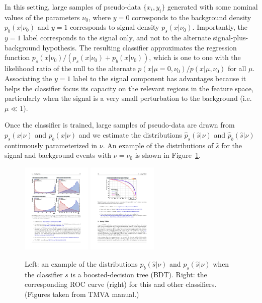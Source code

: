 \documentclass[12pt]{article}
\numberwithin{equation}{section}
\theoremstyle{plain}
\begin{document}
In this setting, large samples of pseudo-data $\{x_i, y_i\}$ generated with some
nominal values of the parameters $\nu_0$, where $y=0$ corresponds to the
background density $p_b(x|\nu_0)$  and $y=1$ corresponds to signal density
$p_s(x|\nu_0)$. Importantly, the $y=1$ label corresponds to the signal only, and
not to the alternate signal-plus-background hypothesis. The resulting classifier
approximates the regression function $p_s(x|\nu_0)/(p_s(x|\nu_0)+p_b(x|\nu_0))$,
which is one to one with the likelihood ratio of the null to the alternate
$p(x|\mu=0,\nu_0)/p(x|\mu,\nu_0)$ for all $\mu$. Associating the $y=1$ label to
the signal component has advantages because it helps the classifier focus its
capacity on the relevant regions in the feature space, particularly when the
signal is a very small perturbation to the background (i.e. $\mu \ll 1$).

 Once the classifier is trained, large samples of pseudo-data are drawn from
 $p_s(x | \nu)$ and $p_b(x | \nu)$ and we estimate the distributions
 $\hat{p}_s(\hat s | \nu)$ and $\hat{p}_b(\hat s | \nu)$ continuously
 parameterized in $\nu$. An example of the distributions of $\hat s$ for the
 signal and background events with $\nu=\nu_0$ is shown in
 Figure~\ref{fig:tmva}.

\begin{figure}[t]
\begin{center}
 \includegraphics[height=1.7in]{figures/example-TMVA-BDT.pdf}
 \includegraphics[height=1.7in]{figures/example-TMVA-ROC.pdf}
\caption{Left: an example of the distributions $p_b(\hat s|\nu)$ and $p_s(\hat s|\nu)$ when the classifier $s$ is a boosted-decision tree (BDT). Right: the corresponding ROC curve (right) for this and other classifiers. (Figures taken from TMVA manual.)}
\label{fig:tmva}
\end{center}
\end{figure}
\end{document}
